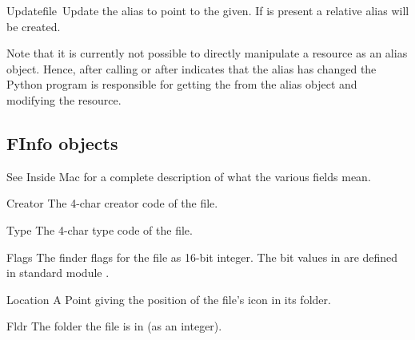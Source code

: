 \begin{funcdesc}{Update}{file\, }
Update the alias to point to the  given. If  is
present a relative alias will be created.
\end{funcdesc}

Note that it is currently not possible to directly manipulate a resource
as an alias object. Hence, after calling  or after
 indicates that the alias has changed the Python program
is responsible for getting the  from the alias object and
modifying the resource.


\subsection{FInfo objects}

See Inside Mac for a complete description of what the various fields
mean.

\renewcommand{\indexsubitem}{(FInfo object attribute)}
\begin{datadesc}{Creator}
The 4-char creator code of the file.
\end{datadesc}

\begin{datadesc}{Type}
The 4-char type code of the file.
\end{datadesc}

\begin{datadesc}{Flags}
The finder flags for the file as 16-bit integer. The bit values in
 are defined in standard module .
\end{datadesc}

\begin{datadesc}{Location}
A Point giving the position of the file's icon in its folder.
\end{datadesc}

\begin{datadesc}{Fldr}
The folder the file is in (as an integer).
\end{datadesc}

